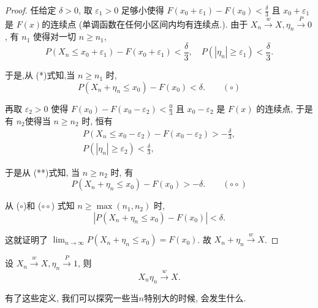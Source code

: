 {{\begin{proof}
任给定 $\delta>0$, 取 $\varepsilon_1>0$ 足够小使得 $F\left(x_0+\varepsilon_1\right)-F\left(x_0\right)<\frac{\delta}{3}$ 且 $x_0+\varepsilon_1$ 是 $F(x)$的连续点 (单调函数在任何小区间内均有连续点.). 由于 $X_n \stackrel{w}{\longrightarrow} X, \eta_n \stackrel{P}{\longrightarrow} 0$, 有 $n_1$ 使得对一切 $n \geqslant n_1$,
$$
P\left(X_n \leqslant x_0+\varepsilon_1\right)-F\left(x_0+\varepsilon_1\right)<\frac{\delta}{3}, \quad P\left(\left|\eta_n\right| \geqslant \varepsilon_1\right)<\frac{\delta}{3} .
$$

于是,从 (*)式知,当 $n \geqslant n_1$ 时,
$$
P\left(X_n+\eta_n \leqslant x_0\right)-F\left(x_0\right)<\delta . \qquad (\circ)
$$

再取 $\varepsilon_2>0$ 使得 $F\left(x_0\right)-F\left(x_0-\varepsilon_2\right)<\frac{0}{3}$ 且 $x_0-\varepsilon_2$ 是 $F(x)$ 的连续点, 于是有 $n_2$使得当 $n \geqslant n_2$ 时, 恒有
$$
\begin{gathered}
P\left(X_n \leqslant x_0-\varepsilon_2\right)-F\left(x_0-\varepsilon_2\right)>-\frac{\delta}{3}, \\
P\left(\left|\eta_n\right| \geqslant \varepsilon_2\right)<\frac{\delta}{3},
\end{gathered}
$$

于是从 (**)式知, 当 $n \geqslant n_2$ 时, 有
$$
P\left(X_n+\eta_n \leqslant x_0\right)-F\left(x_0\right)>-\delta . \quad \quad (\circ\circ)
$$

从 ($\circ$)和 ($\circ\circ$) 式知 $n \geqslant \max \left(n_1, n_2\right)$ 时,
$$
\left|P\left(X_n+\eta_n \leqslant x_0\right)-F\left(x_0\right)\right|<\delta .
$$

这就证明了 $\lim _{n \rightarrow \infty} P\left(X_n+\eta_n \leqslant x_0\right)=F\left(x_0\right)$. 故 $X_n+\eta_n \stackrel{w}{\longrightarrow} X$.
\end{proof}
}}

\begin{theorem}
    设 $X_n \stackrel{w}{\longrightarrow} X, \eta_n \stackrel{P}{\longrightarrow} 1$, 则
$$
X_n \eta_n \stackrel{w}{\longrightarrow} X .
$$
\end{theorem}

有了这些定义, 我们可以探究一些当$n$特别大的时候, 会发生什么.